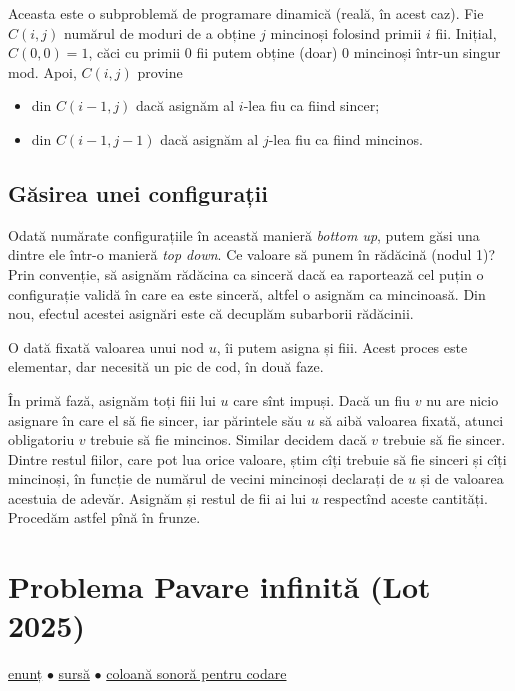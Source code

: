 Aceasta este o subproblemă de programare dinamică (reală, în acest caz). Fie $C(i, j)$ numărul de moduri de a obține $j$ mincinoși folosind primii $i$ fii. Inițial, $C(0, 0) = 1$, căci cu primii 0 fii putem obține (doar) 0 mincinoși într-un singur mod. Apoi, $C(i, j)$ provine

\begin{itemize}
  \item din $C(i - 1, j)$ dacă asignăm al $i$-lea fiu ca fiind sincer;
  \item din $C(i - 1, j - 1)$ dacă asignăm al $j$-lea fiu ca fiind mincinos.
\end{itemize}

\subsection{Găsirea unei configurații}

Odată numărate configurațiile în această manieră \textit{bottom up}, putem găsi una dintre ele într-o manieră \textit{top down}. Ce valoare să punem în rădăcină (nodul 1)? Prin convenție, să asignăm rădăcina ca sinceră dacă ea raportează cel puțin o configurație validă în care ea este sinceră, altfel o asignăm ca mincinoasă. Din nou, efectul acestei asignări este că decuplăm subarborii rădăcinii.

O dată fixată valoarea unui nod $u$, îi putem asigna și fiii. Acest proces este elementar, dar necesită un pic de cod, în două faze.

În primă fază, asignăm toți fiii lui $u$ care sînt impuși. Dacă un fiu $v$ nu are nicio asignare în care el să fie sincer, iar părintele său $u$ să aibă valoarea fixată, atunci obligatoriu $v$ trebuie să fie mincinos. Similar decidem dacă $v$ trebuie să fie sincer. Dintre restul fiilor, care pot lua orice valoare, știm cîți trebuie să fie sinceri și cîți mincinoși, în funcție de numărul de vecini mincinoși declarați de $u$ și de valoarea acestuia de adevăr. Asignăm și restul de fii ai lui $u$ respectînd aceste cantități. Procedăm astfel pînă în frunze.

\section{Problema Pavare infinită (Lot 2025)}
\label{problem:pavare-infinită}

\href{https://kilonova.ro/problems/3793}{enunț}
$\bullet$
\hyperref[code:pavare-infinită]{sursă}
$\bullet$
\href{https://www.youtube.com/watch?v=wH-DvxDh_nw}{coloană sonoră pentru codare}

